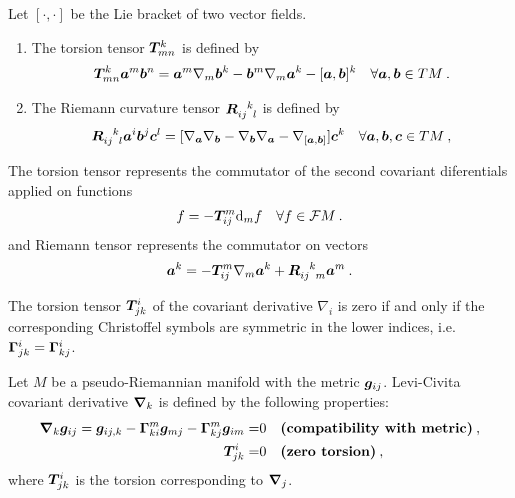 \begin{definition}
    Let $[\cdot,\cdot]$ be the Lie bracket of two vector fields.

    \begin{enumerate}
        \item The torsion tensor $\boldsymbol{T}^{k}_{mn}$ is defined by
        \begin{align}
            \boldsymbol{T}^k_{mn} \boldsymbol{a}^m \boldsymbol{b}^n = \boldsymbol{a}^m \nabla_m \boldsymbol{b}^k - \boldsymbol{b}^m \nabla_m \boldsymbol{a}^k - [\boldsymbol{a}, \boldsymbol{b}]^k \quad \forall \boldsymbol{a}, \boldsymbol{b} \in TM \:.
        \end{align}
        \item The Riemann curvature tensor $\vc R\indices{_i_j^k_l}$ is defined by
        \begin{align}
            \vc R\indices{_i_j^k_l} \vc a^i \vc b^j \vc c^l = [\nabla_{\vc a} \nabla_{\vc b} - \nabla_{\vc b} \nabla_{\vc a} - \nabla_{[\vc a, \vc b]}] \vc c^k \quad \forall \vc a, \vc b, \vc c \in TM \:,
        \end{align}
    \end{enumerate}
\end{definition}


The torsion tensor represents the commutator of the second covariant diferentials applied on functions
\begin{align}
    [\nabla_i \nabla_j - \nabla_j \nabla_i] f = - \vc T^{m}_{ij} \D_m f \quad \forall f \in \mathcal F M \:.
\end{align}
and Riemann tensor represents the commutator on vectors
\begin{align}
    [\nabla_i \nabla_j - \nabla_j \nabla_i] \vc a^k =  - \vc T_{ij}^m \nabla_m \vc a^k + \vc R\indices{_i_j^k_m} \vc a^m \:. 
\end{align}

\begin{proposition}
    The torsion tensor $\boldsymbol{T}^i_{jk}$ of the covariant derivative $\nabla_i$ is zero if and only if the corresponding Christoffel symbols are symmetric in the lower indices, i.e. $\boldsymbol{\Gamma}^i_{jk} = \boldsymbol{\Gamma}^i_{kj}$.
\end{proposition}


\begin{definition}
    Let $M$ be a pseudo-Riemannian manifold with the metric $\boldsymbol{g}_{ij}$. Levi-Civita covariant derivative $\boldsymbol{\nabla}_k$ is defined by the following properties:
    \begin{align}
        \boldsymbol{\nabla}_k \boldsymbol{g}_{ij} = \boldsymbol{g}_{ij,k} - \boldsymbol{\Gamma}^m_{ki} \boldsymbol{g}_{mj} - \boldsymbol{\Gamma}^m_{kj} \boldsymbol{g}_{im}  =& 0 \quad \textbf{(compatibility with metric)} \:, \\
        \boldsymbol{T}^{i}_{jk} =& 0 \quad \textbf{(zero torsion)} \:,
    \end{align}
    where $\boldsymbol{T}^i_{jk}$ is the torsion corresponding to $\boldsymbol{\nabla}_j$.
\end{definition}

